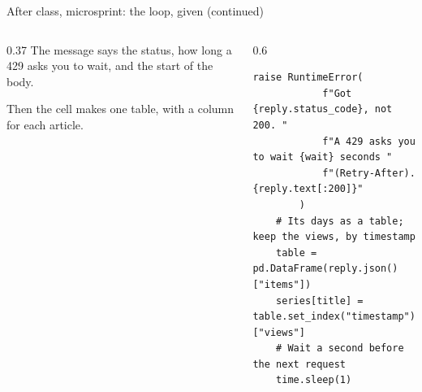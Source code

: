 \documentclass[9pt,aspectratio=169]{beamer}
\begin{document}
\begin{frame}[fragile]{After class, microsprint: the loop, given (continued)}
    \begin{columns}[T]
        \begin{column}{0.37\textwidth}
            The message says the status, how long a 429 asks you to wait, and the start of the body.

            \medskip
            Then the cell makes one table, with a column for each article.
        \end{column}
        \begin{column}{0.6\textwidth}
\begin{lstlisting}[style=lab]
        raise RuntimeError(
            f"Got {reply.status_code}, not 200. "
            f"A 429 asks you to wait {wait} seconds "
            f"(Retry-After). {reply.text[:200]}"
        )
    # Its days as a table; keep the views, by timestamp
    table = pd.DataFrame(reply.json()["items"])
    series[title] = table.set_index("timestamp")["views"]
    # Wait a second before the next request
    time.sleep(1)
\end{lstlisting}
        \end{column}
    \end{columns}
\end{frame}
\end{document}
